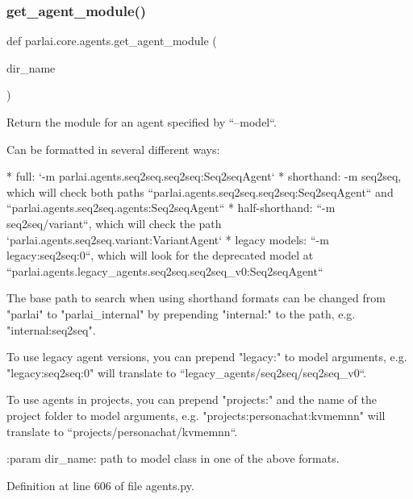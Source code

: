\subsubsection{\texorpdfstring{get\+\_\+agent\+\_\+module()}{get\_agent\_module()}}
{\footnotesize\ttfamily def parlai.\+core.\+agents.\+get\+\_\+agent\+\_\+module (\begin{DoxyParamCaption}\item[{}]{dir\+\_\+name }\end{DoxyParamCaption})}

\begin{DoxyVerb}Return the module for an agent specified by ``--model``.

Can be formatted in several different ways:

* full: `-m parlai.agents.seq2seq.seq2seq:Seq2seqAgent`
* shorthand: -m seq2seq, which will check both paths
  ``parlai.agents.seq2seq.seq2seq:Seq2seqAgent`` and
  ``parlai.agents.seq2seq.agents:Seq2seqAgent``
* half-shorthand: ``-m seq2seq/variant``, which will check the path
  `parlai.agents.seq2seq.variant:VariantAgent`
* legacy models: ``-m legacy:seq2seq:0``, which will look for the deprecated
  model at ``parlai.agents.legacy_agents.seq2seq.seq2seq_v0:Seq2seqAgent``

The base path to search when using shorthand formats can be changed from
"parlai" to "parlai_internal" by prepending "internal:" to the path, e.g.
"internal:seq2seq".

To use legacy agent versions, you can prepend "legacy:" to model arguments,
e.g. "legacy:seq2seq:0" will translate to ``legacy_agents/seq2seq/seq2seq_v0``.

To use agents in projects, you can prepend "projects:" and the name of the
project folder to model arguments, e.g. "projects:personachat:kvmemnn"
will translate to ``projects/personachat/kvmemnn``.

:param dir_name: path to model class in one of the above formats.
\end{DoxyVerb}
 

Definition at line 606 of file agents.\+py.


